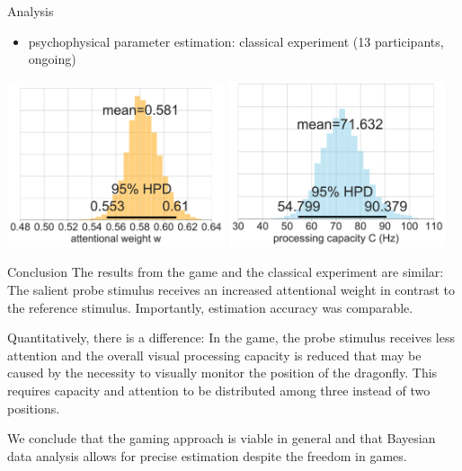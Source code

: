 \documentclass[a0paper,portrait]{baposter}
\begin{document}
\begin{poster}
\begin{posterbox}[name=results,span=1,column=2,row=0]{Analysis}
\begin{itemize}
\item psychophysical parameter estimation: classical experiment (13 participants, ongoing)
\end{itemize}

\begin{center}
\includegraphics[width=0.48\textwidth]{exp-w-hdi-rs.pdf}
\includegraphics[width=0.48\textwidth]{exp-c-hdi-rs.pdf}
\end{center}

\end{posterbox}

\begin{posterbox}[name=conclusion,span=1,column=2,row=2,below=results]{Conclusion}
The results from the game and the classical experiment are similar: The salient probe stimulus receives an increased attentional weight in contrast to the reference stimulus. Importantly, estimation accuracy was comparable.

Quantitatively, there is a difference: In the game, the probe stimulus receives less attention and the overall visual processing capacity is reduced that may be caused by the necessity to visually monitor the position of the dragonfly. This requires capacity and attention to be distributed among three instead of two positions.

We conclude that the gaming approach is viable in general and that Bayesian data analysis allows for precise estimation despite the freedom in games.
\end{posterbox}


\end{poster}
\end{document}
